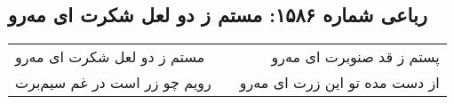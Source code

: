 \begin{center}
\section*{رباعی شماره ۱۵۸۶: مستم ز دو لعل شکرت ای مه‌رو}
\label{sec:1586}
\begin{longtable}{l p{0.5cm} r}
مستم ز دو لعل شکرت ای مه‌رو
&&
پستم ز قد صنوبرت ای مه‌رو
\\
رویم چو زر است در غم سیم‌برت
&&
از دست مده تو این زرت ای مه‌رو
\\
\end{longtable}
\end{center}
